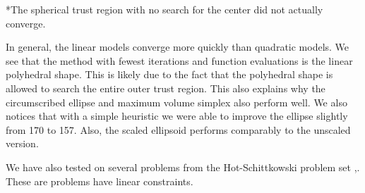 \begin{center}
\begin{tabular}{ c c c c c c c c }






\end{tabular}
\end{center}

*The spherical trust region with no search for the center did not actually converge.

In general, the linear models converge more quickly than quadratic models.
We see that the method with fewest iterations and function evaluations is the linear polyhedral shape.
This is likely due to the fact that the polyhedral shape is allowed to search the entire outer trust region.
This also explains why the circumscribed ellipse and maximum volume simplex also perform well.
We also notices that with a simple heuristic we were able to improve the ellipse slightly from 170 to 157.
Also, the scaled ellipsoid performs comparably to the unscaled version.

We have also tested on several problems from the Hot-Schittkowski problem set \cite{Schittkowski:1987:MTE:27135},\cite{Hock1980}.
These are problems have linear constraints.


